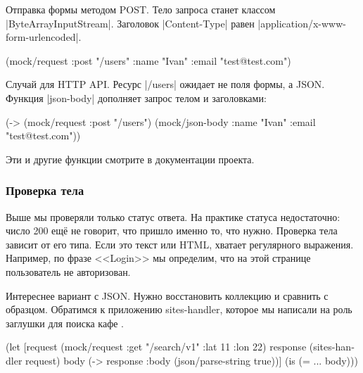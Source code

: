 \noindent
Отправка формы методом POST. Тело запроса станет классом
\spverb|ByteArrayInputStream|. Заголовок \spverb|Content-Type| равен
\spverb|application/x-www-form-urlencoded|.

\begin{english}
  \begin{clojure}
(mock/request :post "/users"
              {:name "Ivan" :email "test@test.com"})
  \end{clojure}
\end{english}


\noindent
Случай для HTTP API. Ресурс \spverb|/users| ожидает не поля формы, а JSON.
Функция \spverb|json-body| дополняет запрос телом и заголовками:

\begin{english}
  \begin{clojure}
(-> (mock/request :post "/users")
    (mock/json-body {:name "Ivan" :email "test@test.com"}))
  \end{clojure}
\end{english}

\noindent
Эти и другие функции смотрите в документации проекта.

\subsubsection*{Проверка тела}

Выше мы проверяли только статус ответа. На практике статуса недостаточно: число
200 ещ\"{е} не говорит, что пришло именно то, что нужно. Проверка тела зависит от
его типа. Если это текст или HTML, хватает регулярного выражения. Например, по
фразе <<Login>> мы определим, что на этой странице пользователь не авторизован.


Интереснее вариант с JSON. Нужно восстановить коллекцию и сравнить с
образцом. Обратимся к приложению sites-handler, которое мы написали на роль
заглушки для поиска кафе .

\begin{english}
  \begin{clojure}
(let [request (mock/request :get "/search/v1"
                            {:lat 11 :lon 22})
      response (sites-handler request)
      body (-> response :body (json/parse-string true))]
  (is (= {...} body)))
  \end{clojure}
\end{english}

